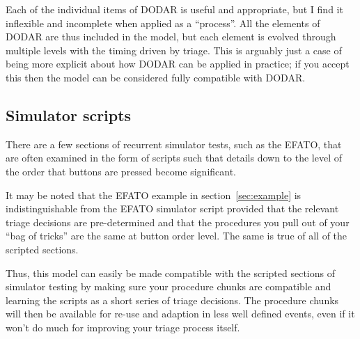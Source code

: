 \documentclass[a5paper,11pt,titlepage]{article}
\begin{document}
Each of the individual items of DODAR is useful and appropriate, but I
find it inflexible and incomplete when applied as a ``process''. All the
elements of DODAR are thus included in the model, but each element is
evolved through multiple levels with the timing driven by triage. This
is arguably just a case of being more explicit about how DODAR can be
applied in practice; if you accept this then the model can be considered
fully compatible with DODAR.

\subsection{Simulator scripts}

There are a few sections of recurrent simulator tests, such as the
EFATO, that are often examined in the form of scripts such that details
down to the level of the order that buttons are pressed become
significant.

It may be noted that the EFATO example in section~\ref{sec:example} is
indistinguishable from the EFATO simulator script provided that the
relevant triage decisions are pre-determined and that the procedures you
pull out of your ``bag of tricks'' are the same at button order
level. The same is true of all of the scripted sections.

Thus, this model can easily be made compatible with the scripted
sections of simulator testing by making sure your procedure chunks are
compatible and learning the scripts as a short series of triage
decisions. The procedure chunks will then be available for re-use and
adaption in less well defined events, even if it won't do much for
improving your triage process itself.
\end{document}
